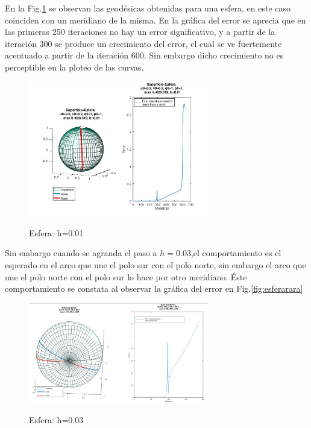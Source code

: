 \documentclass{endm}
\begin{document}
En la Fig.\ref{fig:esfera} se observan las geod\'esicas obtenidas para una esfera, en este caso coinciden con un meridiano de la misma. En la gráfica del error se aprecia que en las primeras 250 iteraciones no hay un error significativo, y a partir de la iteraci\'on 300 se produce un crecimiento del error, el cual se ve fuertemente acentuado a partir de la iteraci\'on 600. Sin embargo dicho crecimiento no es perceptible en la ploteo de las curvas.
\begin{figure}[H]
\caption{Esfera: h=0.01}
\centering
\includegraphics[width=0.7\textwidth]{esfera.jpg}
\label{fig:esfera}
\end{figure}

Sin embargo cuando se agranda el paso a $h=0.03$,el comportamiento es el esperado en el arco que une el polo sur con el polo norte, sin embargo el arco que une el polo norte con el polo sur lo hace por otro meridiano. \'Este comportamiento se constata al observar la gr\'afica del error en Fig.\ref{fig:esferarara}

\begin{figure}[H]
\caption{Esfera: h=0.03 }
\centering
\includegraphics[width=0.7\textwidth]{esferarara.png}
\label{fig:esferamal}
\end{figure}


\tableofcontents
\end{document}
